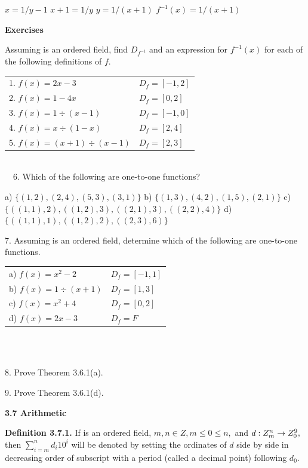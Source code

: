 \begin{large}
$x = 1/y -1$\nl
$x + 1= 1/y$\nl
$y = 1/(x + 1) $\nl
$f^{-1}(x) = 1/(x + 1)$\nl

\textbf{Exercises}\nl

Assuming \of is an ordered field, find $D_{f^{-1}}$ and an expression for $f^{-1}(x)$ for each of the following definitions of $f.$\nl

\begin{tabular}{l l}
1. $f(x)=2x-3$ & $ D_{f} = [-1,2]$\\
2. $f(x)=1 - 4x$& $ D_{f} = [0,2] $\\
3. $f(x)=1\div(x-1)$& $ D_{f}=[-1,0]$ \\
4. $f(x)=x\div (1-x)$ & $D_{f} =[2,4]$\\
5. $f(x)=(x+1)\div(x-1)$ &  $D_{f} = [2,3] $\\
\end{tabular}\\
~~6. Which of the following are one-to-one functions?
\newpage


a) $\{(1,2), (2,4), (5,3), (3,1)\}$\nl
b) $\{(1,3), (4,2), (1,5), (2,1)\}$\nl
c) $\{((1,1),2), ((1,2),3), ((2,1),3), ((2,2),4)\}$\nl
d) $\{((1,1),1), ((1,2),2), ((2,3),6)\}$\nl

7. Assuming \of  is an ordered field, determine which of the following are one-to-one functions.\nl

\begin{tabular}{l l}
a) $f(x)=x^{2} - 2$& $D_{f} = [-1,1]$\\
b) $f(x)=1\div(x+1)$ & $D_{f} = [1,3] $\\
c) $f(x)=x^{2} + 4$ & $D_{f} = [0,2] $\\
d) $f(x)=2x - 3$& $D_{f} = F$\\
\end{tabular}\\
$ $\nl

8. Prove Theorem 3.6.1(a). \nl

9. Prove Theorem 3.6.1(d). \nl

\vfill

\textbf{3.7 Arithmetic} \nl

\textbf{Definition 3.7.1.} If \of  is an ordered field, $m,n\in Z, m\leq 0 \leq n,$  and $d : Z_{m}^{n} \to Z^{9}_{0},  $ then $\sum_{i=m}^{n} d_{i}10^{i}$ will be denoted by setting the ordinates  of $d$ side by side in decreasing order of subscript with a period (called a decimal point) following $d_{0}.$\nl


\end{large}
